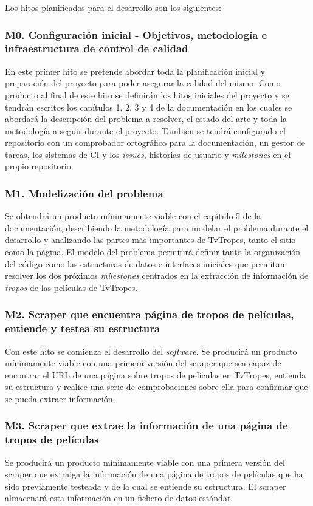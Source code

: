 Los hitos planificados para el desarrollo son los siguientes:

\subsubsection{M0. Configuración inicial - Objetivos, metodología e infraestructura de control de calidad}
En este primer hito se pretende abordar toda la planificación inicial y
preparación del proyecto para poder asegurar la calidad del mismo. Como producto
al final de este hito se definirán los hitos iniciales del proyecto y se tendrán
escritos los capítulos 1, 2, 3 y 4 de la documentación en los cuales se abordará
la descripción del problema a resolver, el estado del arte y toda la metodología
a seguir durante el proyecto. También se tendrá configurado el repositorio con
un comprobador ortográfico para la documentación, un gestor de tareas, los
sistemas de CI y los \textit{issues}, historias de usuario y \textit{milestones}
en el propio repositorio.

\subsubsection{M1. Modelización del problema}
Se obtendrá un producto mínimamente viable con el capítulo 5 de la
documentación, describiendo la metodología para modelar el problema durante el
desarrollo y analizando las partes más importantes de TvTropes, tanto el sitio
como la página. El modelo del problema permitirá definir tanto la organización
del código como las estructuras de datos e interfaces iniciales que permitan
resolver los dos próximos \textit{milestones} centrados en la extracción de
información de \textit{tropos} de las películas de TvTropes.

\subsubsection{M2. Scraper que encuentra página de tropos de películas, entiende y testea su estructura}
Con este hito se comienza el desarrollo del \textit{software}. Se producirá un
producto mínimamente viable con una primera versión del scraper que sea capaz de
encontrar el URL de una página sobre tropos de películas en TvTropes, entienda
su estructura y realice una serie de comprobaciones sobre ella para confirmar
que se pueda extraer información.

\subsubsection{M3. Scraper que extrae la información de una página de tropos de películas}
Se producirá un producto mínimamente viable con una primera versión del scraper
que extraiga la información de una página de tropos de películas que ha sido
previamente testeada y de la cual se entiende su estructura. El scraper
almacenará esta información en un fichero de datos estándar.

